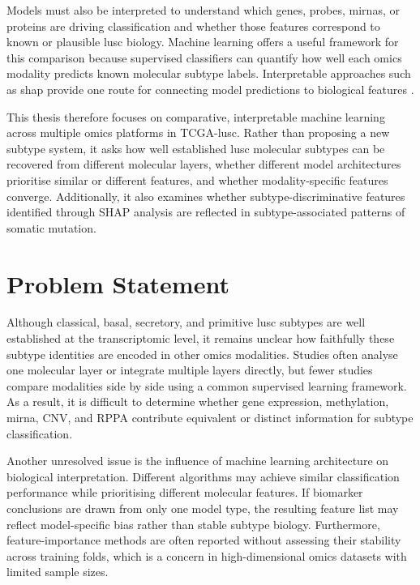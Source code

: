 Models must also be interpreted to understand which genes, probes, \gls{mirna}s, or proteins are driving classification and whether those features correspond to known or plausible \gls{lusc} biology. Machine learning offers a useful framework for this comparison because supervised classifiers can quantify how well each omics modality predicts known molecular subtype labels. Interpretable approaches such as \gls{shap} provide one route for connecting model predictions to biological features \parencite{Lundberg2017,Lundberg2020}.

This thesis therefore focuses on comparative, interpretable machine learning across multiple omics platforms in TCGA-\gls{lusc}. Rather than proposing a new subtype system, it asks how well established \gls{lusc} molecular subtypes can be recovered from different molecular layers, whether different model architectures prioritise similar or different features, and whether modality-specific features converge. Additionally, it also examines whether subtype-discriminative features identified through SHAP analysis are reflected in subtype-associated patterns of somatic mutation.

\section{Problem Statement}

Although classical, basal, secretory, and primitive \gls{lusc} subtypes are well established at the transcriptomic level, it remains unclear how faithfully these subtype identities are encoded in other omics modalities. Studies often analyse one molecular layer or integrate multiple layers directly, but fewer studies compare modalities side by side using a common supervised learning framework. As a result, it is difficult to determine whether gene expression, methylation, \gls{mirna}, CNV, and RPPA contribute equivalent or distinct information for subtype classification.

Another unresolved issue is the influence of machine learning architecture on biological interpretation. Different algorithms may achieve similar classification performance while prioritising different molecular features. If biomarker conclusions are drawn from only one model type, the resulting feature list may reflect model-specific bias rather than stable subtype biology. Furthermore, feature-importance methods are often reported without assessing their stability across training folds, which is a concern in high-dimensional omics datasets with limited sample sizes.

